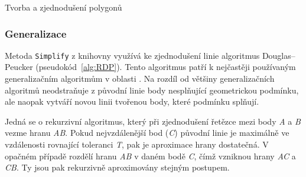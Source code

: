 \begin{algorithm}
\caption{Tvorba a zjednodušení polygonů}
\label{alg:polygon}
    \begin{algorithmic}[1] 
			\ELSE
			\ENDIF
		\ENDWHILE	
	\ENDWHILE
    \end{algorithmic}
\end{algorithm}

\newpage
\subsubsection{Generalizace}
Metoda \texttt{Simplify} z knihovny  využívá ke zjednodušení
linie algoritmus Douglas–Peucker (pseudokód~\ref{alg:RDP}). Tento
algoritmus patří k nejčastěji používaným generalizačním algoritmům v
oblasti . Na rozdíl od většiny generalizačních algoritmů
neodstraňuje z původní linie body nesplňující geometrickou podmínku,
ale naopak vytváří novou linii tvořenou body, které podmínku splňují.
	
Jedná se o rekurzivní algoritmus, který při zjednodušení řetězce mezi
body \textit{A} a \textit{B} vezme hranu \textit{AB}. Pokud
nejvzdálenější bod (\textit{C}) původní linie je maximálně ve
vzdálenosti rovnající toleranci \textit{T}, pak je aproximace hrany
dostatečná. V opačném případě rozdělí hranu \textit{AB} v daném bodě
\textit{C}, čímž vzniknou hrany \textit{AC} a \textit{CB}. Ty jsou pak
rekurzivně aproximovány stejným
postupem. \cite{hershberger1992speeding}
	

